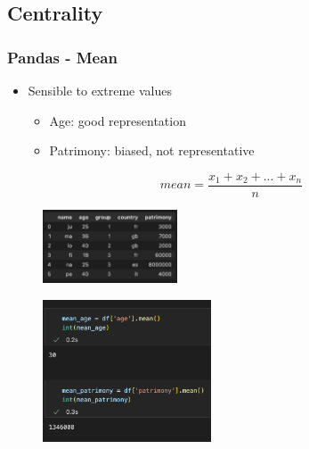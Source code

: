 \subsection{Centrality}

\begin{frame}\frametitle{Pandas - Mean}
   \begin{minipage}{0.58\linewidth}
      \begin{itemize}
         \item Sensible to extreme values
         \begin{itemize}
            \item Age: good representation
            \item Patrimony: biased, not representative
         \end{itemize}
      \end{itemize}
      \vspace{.5cm}
      $$mean = \frac{x_1 + x_2 + ... + x_n}{n}$$
      \begin{figure}[H]
         \includegraphics[width=4cm]{../images/illustrations/data_analysis_df_1.png}
      \end{figure}
   \end{minipage}
   \begin{minipage}{0.38\linewidth}
      \begin{figure}[H]
         \includegraphics[width=5cm]{../images/illustrations/mean.png}
      \end{figure}
   \end{minipage}
\end{frame}



